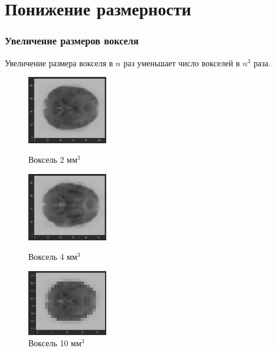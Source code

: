 \documentclass{beamer}
\begin{document}
	\section{Понижение размерности}
	\begin{frame} 
		\frametitle{Увеличение размеров вокселя}
		
		Увеличение размера вокселя в $n$ раз уменьшает число вокселей в $n^3$ раза.
		\vspace{0.5cm}
										
			\begin{figure}
				\begin{minipage}{3.5cm}
					\includegraphics[width=3.5cm]{../images/downsampling2mm_1.png}
					\caption{Воксель 2 мм$^3$}
					\label{fg:6}
				\end{minipage}\hfill
				\begin{minipage}{3.5cm}
					\includegraphics[width=3.5cm]{../images/downsampling4mm_2.png}
					\caption{Воксель 4 мм$^3$}
					\label{fg:7}
				\end{minipage}\hfill
				\begin{minipage}{3.5cm}
					\includegraphics[width=3.5cm]{../images/downsampling10mm_3.png}
					\caption{Воксель 10 мм$^3$}
					\label{fg:8}
				\end{minipage}
			\end{figure}	
	\end{frame}
\end{document}
